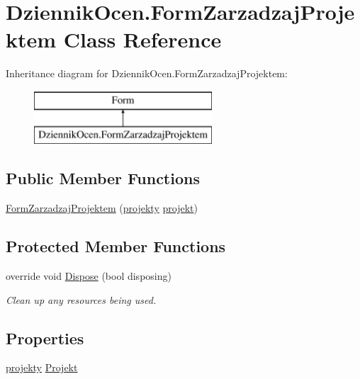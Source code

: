 \hypertarget{class_dziennik_ocen_1_1_form_zarzadzaj_projektem}{}\section{Dziennik\+Ocen.\+Form\+Zarzadzaj\+Projektem Class Reference}
\label{class_dziennik_ocen_1_1_form_zarzadzaj_projektem}
Inheritance diagram for Dziennik\+Ocen.\+Form\+Zarzadzaj\+Projektem\+:\begin{figure}[H]
\begin{center}
\leavevmode
\includegraphics[height=2.000000cm]{class_dziennik_ocen_1_1_form_zarzadzaj_projektem}
\end{center}
\end{figure}
\subsection*{Public Member Functions}
\begin{DoxyCompactItemize}
\item 
\hyperlink{class_dziennik_ocen_1_1_form_zarzadzaj_projektem_ab02c6928f43c0339196925863d7553aa}{Form\+Zarzadzaj\+Projektem} (\hyperlink{class_dziennik_ocen_1_1projekty}{projekty} \hyperlink{class_dziennik_ocen_1_1_form_zarzadzaj_projektem_ad28eeefcf293cabe18ed034de6f7b9b9}{projekt})
\end{DoxyCompactItemize}
\subsection*{Protected Member Functions}
\begin{DoxyCompactItemize}
\item 
override void \hyperlink{class_dziennik_ocen_1_1_form_zarzadzaj_projektem_ac03323290cf11c8dbd8d88703dca9b0f}{Dispose} (bool disposing)
\begin{DoxyCompactList}\small\item\em Clean up any resources being used. \end{DoxyCompactList}\end{DoxyCompactItemize}
\subsection*{Properties}
\begin{DoxyCompactItemize}
\item 
\hyperlink{class_dziennik_ocen_1_1projekty}{projekty} \hyperlink{class_dziennik_ocen_1_1_form_zarzadzaj_projektem_a34aa59a4cb2a97b1a8f864775d250d45}{Projekt}
\end{DoxyCompactItemize}
